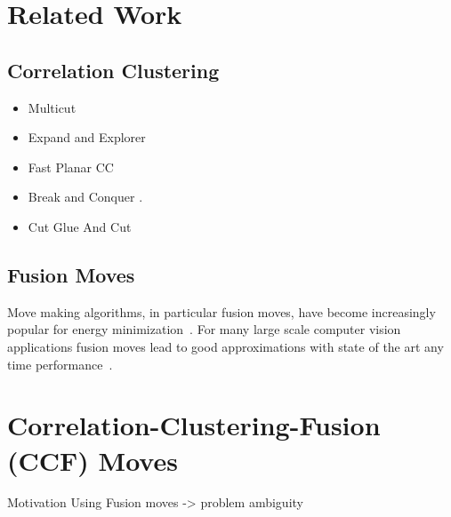 \documentclass[10pt,twocolumn,letterpaper]{article}
\begin{document}
\section{Related Work}

    
    

\subsection{Correlation Clustering}
   \begin{itemize}
   \item Multicut~\cite{kappes_2011_emmcvpr}
   \item Expand and Explorer~\cite{bagon_2011_arxiv}
   \item Fast Planar CC~\cite{yarkony_2012_eccv}
   \item Break and Conquer \cite{alush_2013_simbad}.
   \item Cut Glue And Cut~\cite{beier_2014_cvpr}
   \end{itemize}

\subsection{Fusion Moves}
Move making algorithms, in particular fusion moves, 
have become increasingly popular for energy minimization~\cite{???,kappes_2014_ws}.
For many large scale computer vision applications fusion moves lead to good approximations
with state of the art any time performance~\cite{kappes_2014_ws}.







\section{Correlation-Clustering-Fusion (CCF) Moves}
Motivation Using Fusion moves -> problem ambiguity
\end{document}
